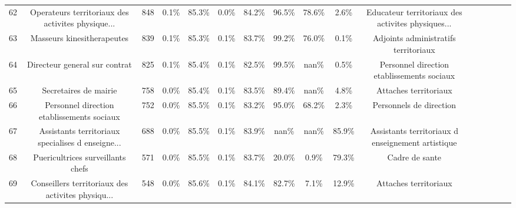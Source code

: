 \documentclass[10pt]{article}
\begin{document}
\begin{landscape}
\begin{longtable}{ | p{0.5cm} |*{15}{c|} }
62  &  Operateurs territoriaux des activites physique... &            848 &           0.1\% &                  85.3\% &                 0.0\% &                    84.2\% &              96.5\% &                             78.6\% &                                     2.6\% &  Educateur territoriaux des activites physiques... \\
63  &                         Masseurs kinesitherapeutes &            839 &           0.1\% &                  85.3\% &                 0.1\% &                    83.7\% &              99.2\% &                             76.0\% &                                     0.1\% &               Adjoints administratifs territoriaux \\
64  &                      Directeur general sur contrat &            825 &           0.1\% &                  85.4\% &                 0.1\% &                    82.5\% &              99.5\% &                              nan\% &                                     0.5\% &         Personnel direction etablissements sociaux \\
65  &                              Secretaires de mairie &            758 &           0.0\% &                  85.4\% &                 0.1\% &                    83.5\% &              89.4\% &                              nan\% &                                     4.8\% &                              Attaches territoriaux \\
66  &         Personnel direction etablissements sociaux &            752 &           0.0\% &                  85.5\% &                 0.1\% &                    83.2\% &              95.0\% &                             68.2\% &                                     2.3\% &                            Personnels de direction \\
67  &  Assistants territoriaux specialises d enseigne... &            688 &           0.0\% &                  85.5\% &                 0.1\% &                    83.9\% &               nan\% &                              nan\% &                                    85.9\% &  Assistants territoriaux d enseignement artistique \\
68  &                  Puericultrices surveillants chefs &            571 &           0.0\% &                  85.5\% &                 0.1\% &                    83.7\% &              20.0\% &                              0.9\% &                                    79.3\% &                                     Cadre de sante \\
69  &  Conseillers territoriaux des activites physiqu... &            548 &           0.0\% &                  85.6\% &                 0.1\% &                    84.1\% &              82.7\% &                              7.1\% &                                    12.9\% &                              Attaches territoriaux \\

\end{longtable}
\end{landscape}
\end{document}
